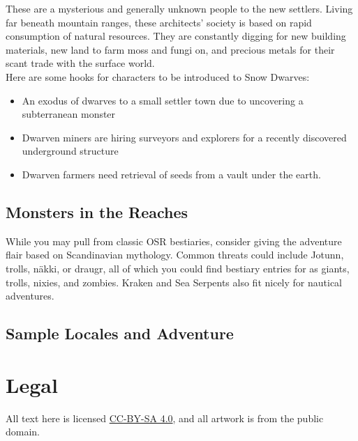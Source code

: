 \documentclass[notitlepage]{article}
\begin{document}
\begin{multicols*}{2}
  These are a mysterious and generally unknown people to the new settlers.
  Living far beneath mountain ranges, these architects' society is based on rapid consumption of natural resources.
  They are constantly digging for new building materials, new land to farm moss and fungi on, and precious metals for their scant trade with the surface world. \\

  Here are some hooks for characters to be introduced to Snow Dwarves:

  \begin{itemize}
  \item An exodus of dwarves to a small settler town due to uncovering a subterranean monster
  \item Dwarven miners are hiring surveyors and explorers for a recently discovered underground structure
  \item Dwarven farmers need retrieval of seeds from a vault under the earth.
  \end{itemize}


  \subsection*{Monsters in the Reaches}

  While you may pull from classic OSR bestiaries, consider giving the adventure flair based on Scandinavian mythology. Common threats could include Jotunn, trolls, n\"akki, or draugr, all of which you could find bestiary entries for as giants, trolls, nixies, and zombies. Kraken and Sea Serpents also fit nicely for nautical adventures. \\

  \subsection*{Sample Locales and Adventure}

  

\section{Legal}

All text here is licensed \href{https://creativecommons.org/licenses/by-sa/4.0/}{CC-BY-SA 4.0}, and all artwork is from the public domain.

\end{multicols*}
\end{document}
